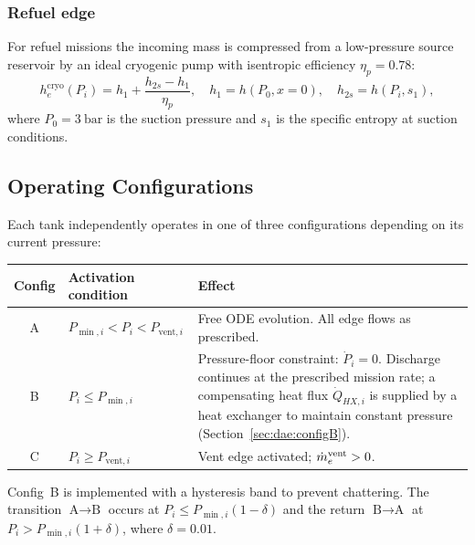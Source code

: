 \subsubsection{Refuel edge}

For refuel missions the incoming mass is compressed from a low-pressure source
reservoir by an ideal cryogenic pump with isentropic efficiency $\eta_p = 0.78$:
\begin{equation}
  h_e^{\text{cryo}}(P_i) = h_1 + \frac{h_{2s} - h_1}{\eta_p},\quad
  h_1 = h(P_0, x{=}0),\quad
  h_{2s} = h(P_i, s_1),
\end{equation}
where $P_0 = \SI{3}{\bar}$ is the suction pressure and $s_1$ is the specific
entropy at suction conditions.

\subsection{Operating Configurations}
\label{sec:dae:config}

Each tank independently operates in one of three configurations depending on its
current pressure:

\begin{center}
\begin{tabularx}{\linewidth}{@{} c l X @{}}
\toprule
\textbf{Config} & \textbf{Activation condition} & \textbf{Effect} \\
\midrule
A & $P_{\min,i} < P_i < P_{\text{vent},i}$ &
  Free ODE evolution.  All edge flows as prescribed. \\[4pt]
B & $P_i \le P_{\min,i}$ &
  Pressure-floor constraint: $\dot{P}_i = 0$.
  Discharge continues at the prescribed mission rate; a compensating heat
  flux $\dot{Q}_{HX,i}$ is supplied by a heat exchanger to maintain
  constant pressure
  (Section~\ref{sec:dae:configB}). \\[4pt]
C & $P_i \ge P_{\text{vent},i}$ &
  Vent edge activated; $\dot{m}_e^{\text{vent}} > 0$. \\
\bottomrule
\end{tabularx}
\end{center}

Config~B is implemented with a hysteresis band to prevent chattering.  The
transition $\text{A}\to\text{B}$ occurs at $P_i \le P_{\min,i}(1-\delta)$ and
the return $\text{B}\to\text{A}$ at $P_i > P_{\min,i}(1+\delta)$, where
$\delta = 0.01$.

